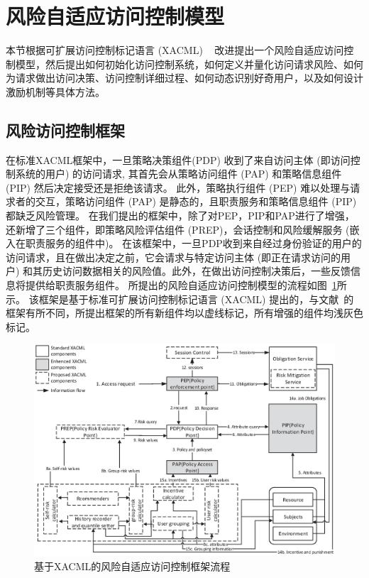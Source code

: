 \section{风险自适应访问控制模型}
\label{sec:proposed model}
本节根据可扩展访问控制标记语言 (XACML) ~\cite{verma2004xml} 改进提出一个风险自适应访问控制模型，然后提出如何初始化访问控制系统，如何定义并量化访问请求风险、如何为请求做出访问决策、访问控制详细过程、如何动态识别好奇用户，以及如何设计激励机制等具体方法。

\subsection{风险访问控制框架}
\label{subsec:framework}

在标准XACML框架中，一旦策略决策组件(PDP) 收到了来自访问主体 (即访问控制系统的用户) 的访问请求, 其首先会从策略访问组件 (PAP) 和策略信息组件 (PIP) 然后决定接受还是拒绝该请求。 此外，策略执行组件 (PEP) 难以处理与请求者的交互，策略访问组件 (PAP) 是静态的，且职责服务和策略信息组件 (PIP) 都缺乏风险管理。
在我们提出的框架中，除了对PEP，PIP和PAP进行了增强，还新增了三个组件，即策略风险评估组件 (PREP)，会话控制和风险缓解服务 (嵌入在职责服务的组件中)。 在该框架中，一旦PDP收到来自经过身份验证的用户的访问请求，且在做出决定之前，它会请求与特定访问主体 (即正在请求访问的用户) 和其历史访问数据相关的风险值。此外，在做出访问控制决策后，一些反馈信息将提供给职责服务组件。 所提出的风险自适应访问控制模型的流程如图~\ref{fig:Process_flow}所示。 该框架是基于标准可扩展访问控制标记语言 (XACML) 提出的，与文献~\cite{shaikh2012dynamic}的框架有所不同，所提出框架的所有新组件均以虚线标记，所有增强的组件均浅灰色标记。


\begin{figure}[htbp]
	\includegraphics[width=\linewidth]{./figures/Process_flow.eps}
	\caption{基于XACML的风险自适应访问控制框架流程}
	\label{fig:Process_flow}
\end{figure}

